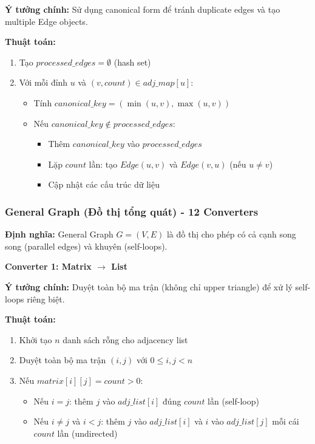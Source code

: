 \documentclass[12pt,a4paper]{article}
\begin{document}
\textbf{Ý tưởng chính:} Sử dụng canonical form để tránh duplicate edges và tạo multiple Edge objects.

\textbf{Thuật toán:}
\begin{enumerate}
    \item Tạo $processed\_edges = \emptyset$ (hash set)
    \item Với mỗi đỉnh $u$ và $(v, count) \in adj\_map[u]$:
    \begin{itemize}
        \item Tính $canonical\_key = (\min(u,v), \max(u,v))$
        \item Nếu $canonical\_key \notin processed\_edges$:
        \begin{itemize}
            \item Thêm $canonical\_key$ vào $processed\_edges$
            \item Lặp $count$ lần: tạo $Edge(u,v)$ và $Edge(v,u)$ (nếu $u \neq v$)
            \item Cập nhật các cấu trúc dữ liệu
        \end{itemize}
    \end{itemize}
\end{enumerate}

\subsubsection{General Graph (Đồ thị tổng quát) - 12 Converters}

\textbf{Định nghĩa:} General Graph $G = (V, E)$ là đồ thị cho phép có cả cạnh song song (parallel edges) và khuyên (self-loops).
\vspace{0.5cm}

\textbf{Converter 1: Matrix $\rightarrow$ List}

\textbf{Ý tưởng chính:} Duyệt toàn bộ ma trận (không chỉ upper triangle) để xử lý self-loops riêng biệt.

\textbf{Thuật toán:}
\begin{enumerate}
    \item Khởi tạo $n$ danh sách rỗng cho adjacency list
    \item Duyệt toàn bộ ma trận $(i,j)$ với $0 \leq i,j < n$
    \item Nếu $matrix[i][j] = count > 0$:
    \begin{itemize}
        \item Nếu $i = j$: thêm $j$ vào $adj\_list[i]$ đúng $count$ lần (self-loop)
        \item Nếu $i \neq j$ và $i < j$: thêm $j$ vào $adj\_list[i]$ và $i$ vào $adj\_list[j]$ mỗi cái $count$ lần (undirected)
    \end{itemize}
\end{enumerate}
\end{document}
